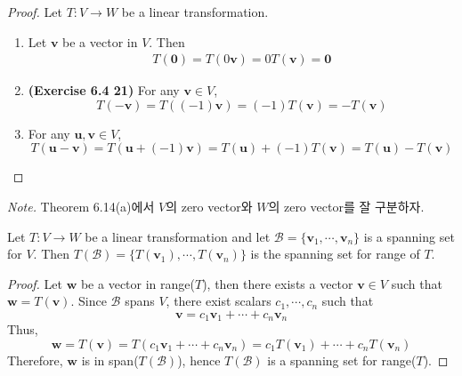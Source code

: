 \begin{proof}
	Let $T: V \rightarrow W$ be a linear transformation.
	\begin{enumerate}
		\item Let $\textbf{v}$ be a vector in $V$. Then \begin{align*}
			T(\textbf{0}) = T(0\textbf{v}) = 0T(\textbf{v}) = \textbf{0}
		\end{align*}
		\item \textbf{(Exercise 6.4 21)} For any $\textbf{v} \in V$, \begin{equation*}
			T(-\textbf{v}) = T((-1)\textbf{v}) = (-1)T(\textbf{v}) = -T(\textbf{v})
		\end{equation*}
		\item For any $\textbf{u}, \textbf{v} \in V$, \begin{equation*}
			T(\textbf{u} - \textbf{v}) = T(\textbf{u} + (-1)\textbf{v}) = T(\textbf{u}) + (-1)T(\textbf{v}) = T(\textbf{u}) - T(\textbf{v})
		\end{equation*}
	\end{enumerate}
\end{proof}

\textit{Note.} Theorem 6.14(a)에서 $V$의 zero vector와 $W$의 zero vector를 잘 구분하자.

\begin{theorem}
	Let $T: V \rightarrow W$ be a linear transformation and let $\mathcal{B} = \{ \textbf{v}_1, \cdots, \textbf{v}_n \}$ is a spanning set for $V$. Then $T(\mathcal{B}) = \{ T(\textbf{v}_1), \cdots, T(\textbf{v}_n) \}$ is the spanning set for range of $T$.
\end{theorem}

\begin{proof}
	Let $\textbf{w}$ be a vector in range($T$), then there exists a vector $\textbf{v} \in V$ such that $\textbf{w} = T(\textbf{v})$. Since $\mathcal{B}$ spans $V$, there exist scalars $c_1, \cdots, c_n$ such that \begin{equation*}
		\textbf{v} = c_1\textbf{v}_1 + \cdots + c_n\textbf{v}_n
	\end{equation*} Thus, \begin{equation*}
		\textbf{w} = T(\textbf{v}) = T(c_1\textbf{v}_1 + \cdots + c_n\textbf{v}_n) = c_1T(\textbf{v}_1) + \cdots + c_nT(\textbf{v}_n)
	\end{equation*} Therefore, $\textbf{w}$ is in span($T(\mathcal{B})$), hence $T(\mathcal{B})$ is a spanning set for range($T$).
\end{proof}


